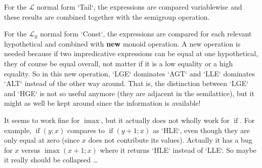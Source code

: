 \documentclass[11pt, twoside, reqno]{book}
\DeclareMathOperator{\imax}{imax}
\DeclareMathOperator{\ifop}{if}
\begin{document}

For the \(\mathcal{L}\) normal form \inHS`Tail`, the expressions are compared variablewise and these results are combined together with the semigroup operation.

For the \(\mathcal{L}_{\ifop}\) normal form \inHS`Const`, the expressions are compared for each relevant hypothetical and combined with \textbf{new} monoid operation.
A new operation is needed because if two impredicative expressions can be equal at one hypothetical, they of course be equal overall, not matter if it is a low equality or a high equality.
So in this new operation, \inHS`LGE` dominates \inHS`AGT` and \inHS`LLE` dominates \inHS`ALT` instead of the other way around.
That is, the distinction between \inHS`LGE` and \inHS`HGE` is not so useful anymore (they are adjacent in the semilattice), but it might as well be kept around since the information is available!

\begin{mdframed}[style=TODO]
It seems to work fine for \(\imax\), but it actually does not wholly work for \(\ifop\).
For example, \(\ifop(y; x)\) compares to \(\ifop(y+1; x)\) as \inHS`HLE`, even though they are only equal at zero (since \(x\) does not contribute its values).
Actually it has a bug for \(x\) versus \(\imax(x+1; x)\) where it returns \inHS`HLE` instead of \inHS`LLE`.
So maybe it really should be collapsed \dots
\end{mdframed}
\end{document}
